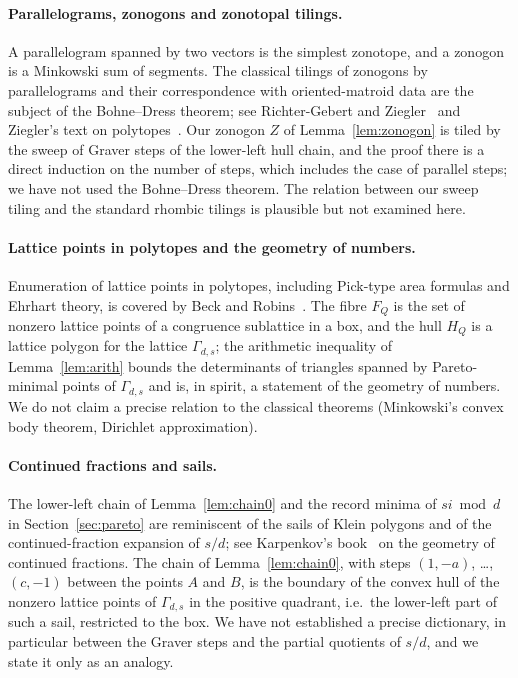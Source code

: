\paragraph{Parallelograms, zonogons and zonotopal tilings.}
A parallelogram spanned by two vectors is the simplest zonotope, and a zonogon is a Minkowski sum of segments. The classical tilings of zonogons by parallelograms and their correspondence with oriented-matroid data are the subject of the Bohne--Dress theorem; see Richter-Gebert and Ziegler~\cite{RichterGebertZiegler1994} and Ziegler's text on polytopes~\cite{Ziegler1995}. Our zonogon $Z$ of Lemma~\ref{lem:zonogon} is tiled by the sweep of Graver steps of the lower-left hull chain, and the proof there is a direct induction on the number of steps, which includes the case of parallel steps; we have not used the Bohne--Dress theorem. The relation between our sweep tiling and the standard rhombic tilings is plausible but not examined here.

\paragraph{Lattice points in polytopes and the geometry of numbers.}
Enumeration of lattice points in polytopes, including Pick-type area formulas and Ehrhart theory, is covered by Beck and Robins~\cite{BeckRobins2015}. The fibre $F_Q$ is the set of nonzero lattice points of a congruence sublattice in a box, and the hull $H_Q$ is a lattice polygon for the lattice $\Gamma_{d,s}$; the arithmetic inequality of Lemma~\ref{lem:arith} bounds the determinants of triangles spanned by Pareto-minimal points of $\Gamma_{d,s}$ and is, in spirit, a statement of the geometry of numbers. We do not claim a precise relation to the classical theorems (Minkowski's convex body theorem, Dirichlet approximation).

\paragraph{Continued fractions and sails.}
The lower-left chain of Lemma~\ref{lem:chain0} and the record minima of $si\bmod d$ in Section~\ref{sec:pareto} are reminiscent of the sails of Klein polygons and of the continued-fraction expansion of $s/d$; see Karpenkov's book~\cite{Karpenkov2013} on the geometry of continued fractions. The chain of Lemma~\ref{lem:chain0}, with steps $(1,-a)$, \dots, $(c,-1)$ between the points $A$ and $B$, is the boundary of the convex hull of the nonzero lattice points of $\Gamma_{d,s}$ in the positive quadrant, i.e.\ the lower-left part of such a sail, restricted to the box. We have not established a precise dictionary, in particular between the Graver steps and the partial quotients of $s/d$, and we state it only as an analogy.

